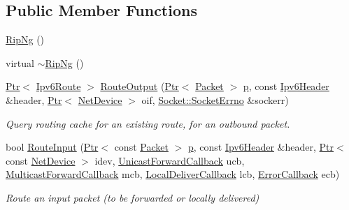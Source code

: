 \subsection*{Public Member Functions}
\begin{DoxyCompactItemize}
\item 
\hyperlink{classns3_1_1RipNg_aa7816865151af06b32f54f67e156f9d4}{Rip\+Ng} ()
\item 
virtual \hyperlink{classns3_1_1RipNg_aff904c44cc5de62ddaa6bce16efc601a}{$\sim$\+Rip\+Ng} ()
\item 
\hyperlink{classns3_1_1Ptr}{Ptr}$<$ \hyperlink{classns3_1_1Ipv6Route}{Ipv6\+Route} $>$ \hyperlink{classns3_1_1RipNg_acc42ebebc7e1b3ccb68c7be6b2f37f95}{Route\+Output} (\hyperlink{classns3_1_1Ptr}{Ptr}$<$ \hyperlink{classns3_1_1Packet}{Packet} $>$ \hyperlink{lte__link__budget__x2__handover__measures_8m_ac9de518908a968428863f829398a4e62}{p}, const \hyperlink{classns3_1_1Ipv6Header}{Ipv6\+Header} \&header, \hyperlink{classns3_1_1Ptr}{Ptr}$<$ \hyperlink{classns3_1_1NetDevice}{Net\+Device} $>$ oif, \hyperlink{classns3_1_1Socket_ada1328c5ae0c28cb2a982caf8f6d6cca}{Socket\+::\+Socket\+Errno} \&sockerr)
\begin{DoxyCompactList}\small\item\em Query routing cache for an existing route, for an outbound packet. \end{DoxyCompactList}\item 
bool \hyperlink{classns3_1_1RipNg_ad85da69a6006cd5089e1a69e7a6be13b}{Route\+Input} (\hyperlink{classns3_1_1Ptr}{Ptr}$<$ const \hyperlink{classns3_1_1Packet}{Packet} $>$ \hyperlink{lte__link__budget__x2__handover__measures_8m_ac9de518908a968428863f829398a4e62}{p}, const \hyperlink{classns3_1_1Ipv6Header}{Ipv6\+Header} \&header, \hyperlink{classns3_1_1Ptr}{Ptr}$<$ const \hyperlink{classns3_1_1NetDevice}{Net\+Device} $>$ idev, \hyperlink{classns3_1_1Ipv6RoutingProtocol_a579fd6755ee873009819f7117371fea7}{Unicast\+Forward\+Callback} ucb, \hyperlink{classns3_1_1Ipv6RoutingProtocol_a5f12e04512ce8e5808c3cceff6b8918f}{Multicast\+Forward\+Callback} mcb, \hyperlink{classns3_1_1Ipv6RoutingProtocol_a93f6c06be1e024747e95f4299eba74a6}{Local\+Deliver\+Callback} lcb, \hyperlink{classns3_1_1Ipv6RoutingProtocol_abfdf43594e2ae97e1a4dc340e3a086a5}{Error\+Callback} ecb)
\begin{DoxyCompactList}\small\item\em Route an input packet (to be forwarded or locally delivered) \end{DoxyCompactList}\item 

\end{DoxyCompactItemize}
